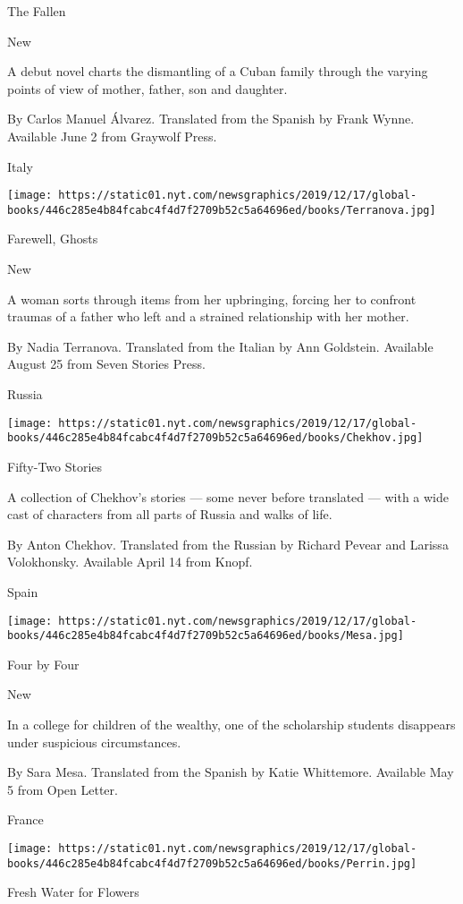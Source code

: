 The Fallen

New

A debut novel charts the dismantling of a Cuban family through the
varying points of view of mother, father, son and daughter.

 By Carlos Manuel Álvarez. Translated from the Spanish by Frank Wynne.
Available June 2 from Graywolf Press.

Italy

\texttt{[image: https://static01.nyt.com/newsgraphics/2019/12/17/global-books/446c285e4b84fcabc4f4d7f2709b52c5a64696ed/books/Terranova.jpg]}

Farewell, Ghosts

New

A woman sorts through items from her upbringing, forcing her to confront
traumas of a father who left and a strained relationship with her
mother.

 By Nadia Terranova. Translated from the Italian by Ann Goldstein.
Available August 25 from Seven Stories Press.

Russia

\texttt{[image: https://static01.nyt.com/newsgraphics/2019/12/17/global-books/446c285e4b84fcabc4f4d7f2709b52c5a64696ed/books/Chekhov.jpg]}

Fifty-Two Stories

A collection of Chekhov's stories --- some never before translated ---
with a wide cast of characters from all parts of Russia and walks of
life.

 By Anton Chekhov. Translated from the Russian by Richard Pevear and
Larissa Volokhonsky. Available April 14 from Knopf.

Spain

\texttt{[image: https://static01.nyt.com/newsgraphics/2019/12/17/global-books/446c285e4b84fcabc4f4d7f2709b52c5a64696ed/books/Mesa.jpg]}

Four by Four

New

In a college for children of the wealthy, one of the scholarship
students disappears under suspicious circumstances.

 By Sara Mesa. Translated from the Spanish by Katie Whittemore.
Available May 5 from Open Letter.

France

\texttt{[image: https://static01.nyt.com/newsgraphics/2019/12/17/global-books/446c285e4b84fcabc4f4d7f2709b52c5a64696ed/books/Perrin.jpg]}

Fresh Water for Flowers

